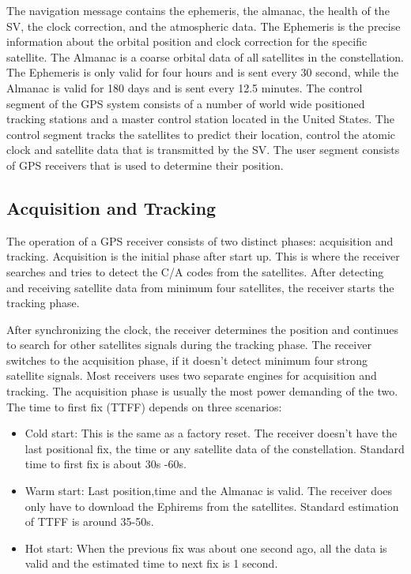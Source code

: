  The navigation message contains the ephemeris, the almanac, the health of the SV, the clock correction, and the atmospheric data. The Ephemeris is the precise information about the orbital position and clock correction for the specific satellite. The Almanac is a coarse orbital data of all satellites in the constellation. The Ephemeris is only valid for four hours and is sent every 30  second, while the Almanac is valid for 180 days and is sent every 12.5 minutes. 
 The control segment of the GPS system consists of a number of world wide positioned tracking stations and a master control station located in the United States. The control segment tracks the satellites to predict their location, control the atomic clock and satellite data that is transmitted by the SV. The user segment consists of GPS receivers that is used to determine their position.
  
  
 \subsection{Acquisition and Tracking}
  
The operation of a GPS receiver consists of two distinct phases: acquisition and tracking. Acquisition is the initial phase after start up. This is where the receiver searches and tries to detect the C/A codes from the satellites. After detecting and receiving satellite data from minimum four satellites, the receiver starts the tracking phase.

After synchronizing the clock, the receiver determines the position and continues to search for other satellites signals during the tracking phase. The receiver switches to the acquisition phase, if it doesn't detect minimum four strong satellite signals.
Most receivers uses two separate engines for acquisition and tracking. The acquisition phase is usually the most power demanding of the two. The time to first fix (TTFF) depends on three scenarios:
\begin{itemize}
\item Cold start: This is the same as a factory reset. The receiver doesn't have the last positional fix, the time or any satellite data of the constellation. Standard time to first fix  is about 30s -60s.
\item Warm start: Last position,time and the Almanac is valid. The receiver does only have to download the Ephirems from the satellites. Standard estimation of TTFF is around 35-50s.
\item Hot start: When the previous fix was about one second ago, all the data is valid and the estimated time to next fix is 1 second. 

\end{itemize}




\newpage